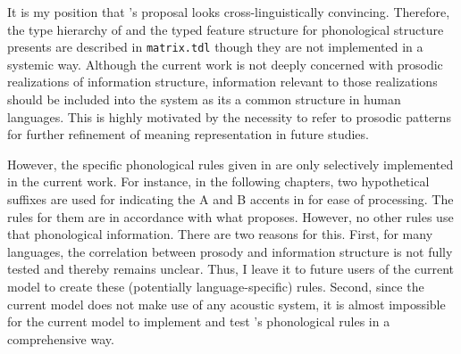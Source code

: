 


It is my position that \citet{bildhauer:07}'s proposal looks
cross-linguistically convincing. Therefore, the type
hierarchy of  and the typed feature structure for
phonological structure \citeauthor{bildhauer:07} presents are
described in \texttt{matrix.tdl} though they are not implemented in a
systemic way.  Although the current work is not deeply concerned with
prosodic realizations of information structure, information relevant
to those realizations should be included into the system as its a
common structure in human languages. This is highly motivated by the
necessity to refer to prosodic patterns for further refinement of
meaning representation in future studies.



However, the specific phonological rules given in
 are only selectively implemented in the
current work. For instance, in the following chapters, two
hypothetical suffixes are used for indicating the A and B accents in
 for ease of processing.  The rules for them are in
accordance with what \citet{bildhauer:07} proposes. However, no other
rules use that phonological information. There are two reasons for
this. First, for many languages, the correlation between
prosody and information structure is not fully tested and thereby
remains unclear. Thus, I leave it to future users of the current model
to create these (potentially language-specific) rules. Second, since
the current model does not make use of any acoustic system, it is
almost impossible for the current model to implement and test
\citeauthor{bildhauer:07}'s phonological rules in a comprehensive way.




